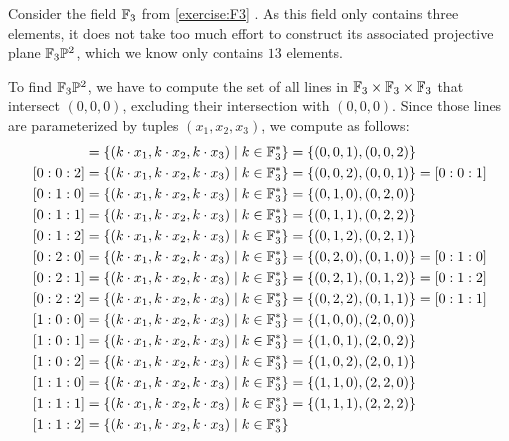 \begin{example} Consider the field $\mathbb{F}_3$ from \exercisename{} \ref{exercise:F3} . As this field only contains three elements, it does not take too much effort to construct its associated projective plane $\mathbb{F}_3\mathbb{P}^2$, which we know only contains $13$ elements.

To find $\mathbb{F}_3\mathbb{P}^2$, we have to compute the set of all lines in $\mathbb{F}_3\times \mathbb{F}_3\times \mathbb{F}_3$ that intersect $(0,0,0)$, excluding their intersection with $(0,0,0)$. Since those lines are parameterized by tuples $(x_1,x_2,x_3)$, we compute as follows:
\begin{align*}
[0:0:1] &= \{(k\cdot x_1,k\cdot x_2, k\cdot x_3)\;|\; k\in\F_3^*\}
          = \{(0,0,1), (0,0,2)\}\\
[0:0:2] &= \{(k\cdot x_1,k\cdot x_2, k\cdot x_3)\;|\; k\in\F_3^*\}
          = \{(0,0,2), (0,0,1)\}
          = [0:0:1]\\
[0:1:0] &= \{(k\cdot x_1,k\cdot x_2, k\cdot x_3)\;|\; k\in\F_3^*\}
          = \{(0,1,0), (0,2,0)\}\\
[0:1:1] &= \{(k\cdot x_1,k\cdot x_2, k\cdot x_3)\;|\; k\in\F_3^*\}
          = \{(0,1,1), (0,2,2)\}\\
[0:1:2] &= \{(k\cdot x_1,k\cdot x_2, k\cdot x_3)\;|\; k\in\F_3^*\}
          = \{(0,1,2), (0,2,1)\}\\
[0:2:0] &= \{(k\cdot x_1,k\cdot x_2, k\cdot x_3)\;|\; k\in\F_3^*\}
          = \{(0,2,0), (0,1,0)\}
          = [0:1:0]\\
[0:2:1] &= \{(k\cdot x_1,k\cdot x_2, k\cdot x_3)\;|\; k\in\F_3^*\}
          = \{(0,2,1), (0,1,2)\}
          = [0:1:2]\\
[0:2:2] &= \{(k\cdot x_1,k\cdot x_2, k\cdot x_3)\;|\; k\in\F_3^*\}
          = \{(0,2,2), (0,1,1)\}
          = [0:1:1]\\
[1:0:0] &= \{(k\cdot x_1,k\cdot x_2, k\cdot x_3)\;|\; k\in\F_3^*\}
          = \{(1,0,0), (2,0,0)\}\\
[1:0:1] &= \{(k\cdot x_1,k\cdot x_2, k\cdot x_3)\;|\; k\in\F_3^*\}
          = \{(1,0,1), (2,0,2)\}\\
[1:0:2] &= \{(k\cdot x_1,k\cdot x_2, k\cdot x_3)\;|\; k\in\F_3^*\}
          = \{(1,0,2), (2,0,1)\}\\
[1:1:0] &= \{(k\cdot x_1,k\cdot x_2, k\cdot x_3)\;|\; k\in\F_3^*\}
          = \{(1,1,0), (2,2,0)\}\\
[1:1:1] &= \{(k\cdot x_1,k\cdot x_2, k\cdot x_3)\;|\; k\in\F_3^*\}
          = \{(1,1,1), (2,2,2)\}\\
[1:1:2]&= \{(k\cdot x_1,k\cdot x_2, k\cdot x_3)\;|\; k\in\F_3^*\}

\end{align*}
\end{example}
